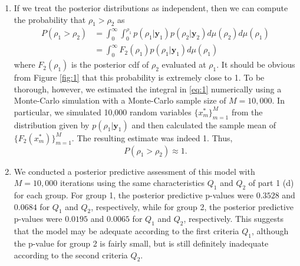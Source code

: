 \documentclass[12pt]{article}
\begin{document}
\begin{enumerate}[leftmargin=*]
\begin{enumerate}[leftmargin=1mm]
      \item If we treat the posterior distributions as independent, then we can compute the probability that $\rho_1 > \rho_2$ as
        \begin{align}
          P(\rho_1 > \rho_2) & = \int_{0}^{\infty}\int_{0}^{\rho_1}p(\rho_1|\bm{y}_1)p(\rho_2|\bm{y}_2) d\mu(\rho_2)d\mu(\rho_1) \nonumber \\
          & = \int_{0}^{\infty} F_{2}(\rho_1)p(\rho_1|\bm{y}_1) d\mu(\rho_1) \label{eq:1}
        \end{align}
        where $F_{2}(\rho_1)$ is the posterior cdf of $\rho_2$ evaluated at $\rho_1$.
        It should be obvious from Figure \ref{fig:1} that this probability is extremely close to 1. To be thorough, however, we estimated the integral
        in \eqref{eq:1}
        numerically using a 
        Monte-Carlo simulation with a Monte-Carlo sample size of $M = 10,000$. 
        In particular, we simulated 10,000 random variables $\{x_{m}^{*}\}_{m=1}^{M}$ from the distribution given by $p(\rho_1|\bm{y}_1)$ and 
        then calculated the sample mean of $\{F_{2}(x_{m}^{*})\}_{m=1}^{M}$. The resulting estimate was indeed 1. Thus,
        \[
          P(\rho_1 > \rho_2) \approx 1.
        \]

      \item We conducted a posterior predictive assessment of this model with $M = 10,000$ iterations 
        using the same characteristics $Q_1$ and $Q_2$ of part 1 (d) for each group. For group 1, the posterior predictive p-values 
        were $0.3528$ and $0.0684$ for $Q_1$ and $Q_2$, respectively, while for group 2, the posterior predictive p-values were
        $0.0195$ and $0.0065$ for $Q_1$ and $Q_2$, respectively. This suggests that the model may be adequate according to the first criteria $Q_1$,
        although the p-value for group 2 is fairly small, but
        is still definitely inadequate according to the second criteria $Q_2$.


\end{enumerate}
\end{enumerate}
\end{document}
